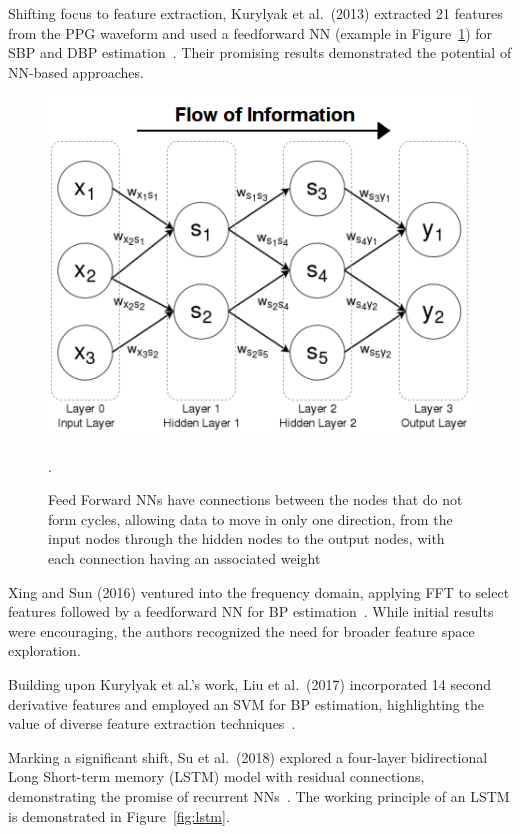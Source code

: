 Shifting focus to feature extraction, Kurylyak et al.\ (2013) extracted 21 features from the PPG waveform and used a feedforward NN (example in Figure~\ref{fig:ffnn}) for SBP and DBP estimation~\cite{kurylyakNeuralNetworkbasedMethod2013}.
Their promising results demonstrated the potential of NN-based approaches.

\begin{figure}[h]
    \centering
    \includegraphics[scale=0.5]{images/ml/ffnn}
    \caption{\small Feed Forward NNs have connections between the nodes that do not form cycles, allowing data to move in only one direction, from the input nodes through the hidden nodes to the output nodes, with each connection having an associated weight~\cite{FeedforwardNeuralNetworks}}.
    \label{fig:ffnn}
\end{figure}

Xing and Sun (2016) ventured into the frequency domain, applying FFT to select features followed by a feedforward NN for BP estimation~\cite{xingOpticalBloodPressure2016}.
While initial results were encouraging, the authors recognized the need for broader feature space exploration.

Building upon Kurylyak et al.'s work, Liu et al.\ (2017) incorporated 14 second derivative features and employed an SVM for BP estimation, highlighting the value of diverse feature extraction techniques~\cite{liuIntegratedNavigationTethered2017}.

Marking a significant shift, Su et al.\ (2018) explored a four-layer bidirectional Long Short-term memory (LSTM) model with residual connections, demonstrating the promise of recurrent NNs~\cite{suLongtermBloodPressure2018}.
The working principle of an LSTM is demonstrated in Figure~\ref{fig:lstm}.

